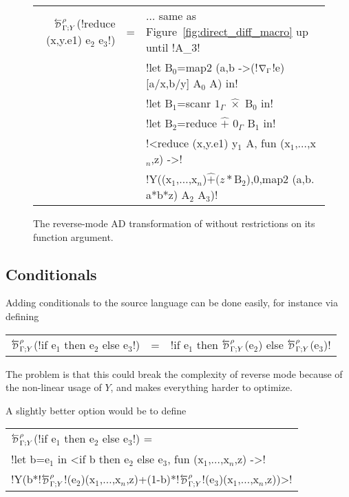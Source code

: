 \begin{figure}

\begin{small}
\begin{tabular}{|r c l|}
\hline
$\directD{\rho}{\Gamma}{Y}$(!reduce (x,y.e1) e$_2$ e$_3$!) 
&=& $\ldots$ same as Figure~\ref{fig:direct_diff_macro} up until !A_$3$! \\
&& !let B$_0$=map2 (a,b ->(!$\nabla_\Gamma$!e)[a/x,b/y] A$_0$ A) in!\\
&& !let B$_1$=scanr $1_\Gamma$ $\widehat{\times}$ B$_0$ in! \\
&& !let B$_2$=reduce $\widehat{+}$ $0_\Gamma$ B$_1$ in! \\
&& !<reduce (x,y.e1) y$_1$ A, fun (x$_1$,$\ldots$,x$_n$,z) ->! \\
&& !Y((x$_1$,$\ldots$,x$_n$)$\widehat{+}(z*$B$_2$),0,map2 (a,b. a*b*z) A$_2$ A$_3$)! \\ \hline
\end{tabular}
\end{small}
\vspace{-0.4cm}
\caption{The reverse-mode AD transformation of  without restrictions on its function argument.}
\vspace{-0.4cm}
\label{fig:lift_reduce}
\end{figure}

\subsection{Conditionals} %
\label{sub:lift_conditional}

Adding conditionals to the source language can be done easily, for instance via defining

\begin{tabular}{r c l}
$\directD{\rho}{\Gamma}{Y}$(!if e$_1$ then e$_2$ else e$_3$!) &=& !if e$_1$ then $\directD{\rho}{\Gamma}{Y}$(e$_2$) else $\directD{\rho}{\Gamma}{Y}$(e$_3$)! 
\end{tabular}

The problem is that this could break the complexity of reverse mode because of the non-linear usage of $Y$, and makes everything harder to optimize.

A slightly better option would be to define 

\begin{tabular}{l}
    $\directD{\rho}{\Gamma}{Y}$(!if e$_1$ then e$_2$ else e$_3$!) = \\
    !let b=e$_1$ in <if b then e$_2$ else e$_3$, fun (x$_1$,$\ldots$,x$_n$,z) ->! \\
    !Y(b*!$\directD{\rho}{\Gamma}{Y}$!(e$_2$)(x$_1$,$\ldots$,x$_n$,z)+(1-b)*!$\directD{\rho}{\Gamma}{Y}$!(e$_3$)(x$_1$,$\ldots$,x$_n$,z))>!
\end{tabular}


